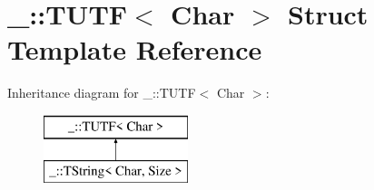 \hypertarget{struct___1_1_t_u_t_f}{}\section{\+\_\+\+:\+:T\+U\+TF$<$ Char $>$ Struct Template Reference}
\label{struct___1_1_t_u_t_f}
Inheritance diagram for \+\_\+\+:\+:T\+U\+TF$<$ Char $>$\+:\begin{figure}[H]
\begin{center}
\leavevmode
\includegraphics[height=2.000000cm]{struct___1_1_t_u_t_f}
\end{center}
\end{figure}
